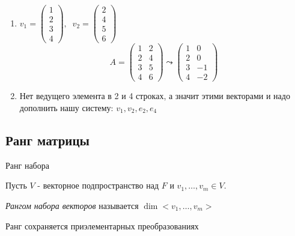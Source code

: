 \begin{problem}
\begin{example}
        \begin{enumerate}
            \item $v_1 = \begin{pmatrix}
                1 \\ 2 \\ 3 \\ 4
            \end{pmatrix}, \;\; v_2 = \begin{pmatrix}
                2 \\ 4 \\ 5 \\ 6
            \end{pmatrix}$
            $$A = \begin{pmatrix}
                1 & 2 \\
                2 & 4 \\
                3 & 5 \\
                4 & 6
            \end{pmatrix} \leadsto \begin{pmatrix}
                1 & 0 \\
                2 & 0 \\
                3 & -1 \\
                4 & -2
            \end{pmatrix}$$
            \item Нет ведущего элемента в 2 и 4 строках, а значит этими векторами и надо дополнить нашу систему: $v_1, v_2, e_2, e_4$
        \end{enumerate}
        
    \end{example}

    \bigskip

    \begin{comment}~
        Дополнение до базиса не единственное. Вместо любого дополняющего набора можно взять любые векторы из его линейной оболочки
    \end{comment}

\end{problem}


\bigskip


\subsection{Ранг матрицы}

\begin{definition} Ранг набора
    
    Пусть $V$ - векторное подпространство над $F$ и $v_1, \dots, v_m \in V$.

    \textit{Рангом набора векторов} называется $\dim<v_1, \dots, v_m>$

    Ранг сохраняется приэлементарных преобразованиях

\end{definition}


